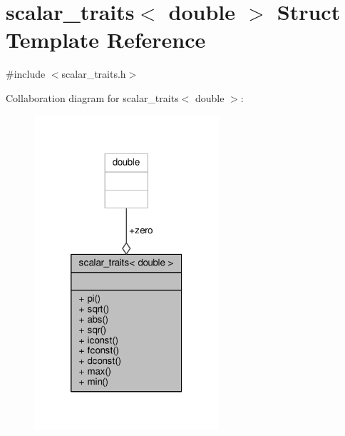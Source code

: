 \hypertarget{structscalar__traits_3_01double_01_4}{\section{scalar\-\_\-traits$<$ double $>$ Struct Template Reference}
\label{structscalar__traits_3_01double_01_4}
}


{\ttfamily \#include $<$scalar\-\_\-traits.\-h$>$}



Collaboration diagram for scalar\-\_\-traits$<$ double $>$\-:\nopagebreak
\begin{figure}[H]
\begin{center}
\leavevmode
\includegraphics[width=194pt]{structscalar__traits_3_01double_01_4__coll__graph}
\end{center}
\end{figure}
